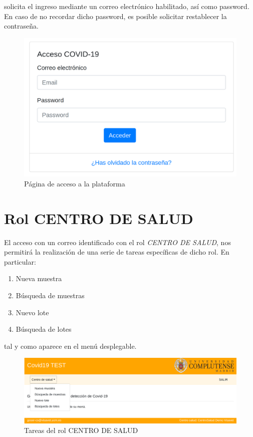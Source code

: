 \documentclass[a4paper,spanish]{paper}
\begin{document}
solicita el ingreso mediante un correo electrónico habilitado, así como password. En caso de no recordar dicho password, es posible solicitar restablecer la contraseña.

\begin{figure}[h]
\centering
\includegraphics[scale=0.6]{Figs/Fig1.png}
\caption{Página de acceso a la plataforma}
\label{Fig1}
\end{figure}


\section{Rol CENTRO DE SALUD}    

El acceso con un correo identificado con el rol \textit{CENTRO DE SALUD}, nos permitirá la realización de una serie de tareas específicas de dicho rol. En particular:

\begin{enumerate}
    \item Nueva muestra
    \item Búsqueda de muestras
    \item Nuevo lote
    \item Búsqueda de lotes
\end{enumerate}

tal y como aparece en el menú desplegable.

\begin{figure}[h]
\centering
\includegraphics[scale=0.6]{Figs/Fig2.png}
\caption{Tareas del rol CENTRO DE SALUD}
\label{Fig2}
\end{figure}
\end{document}
